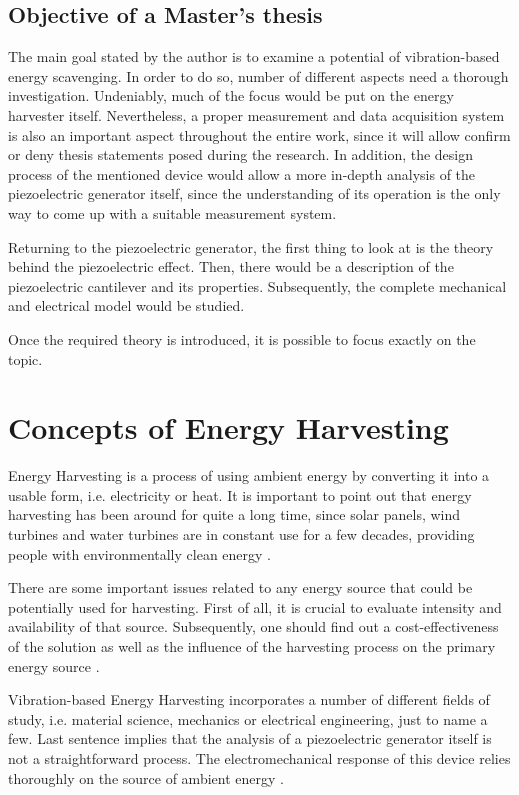 \documentclass[12pt,a4paper]{article}
\begin{document}
\subsection{Objective of a Master's thesis}
The main goal stated by the author is to examine a potential of vibration-based energy scavenging. In order to do so, number of different aspects need a thorough investigation. Undeniably, much of the focus would be put on the energy harvester itself. Nevertheless, a proper measurement and data acquisition system is also an important aspect throughout the entire work, since it will allow confirm or deny thesis statements posed during the research. In addition, the design process of the mentioned device would allow a more in-depth analysis of the piezoelectric generator itself, since the understanding of its operation is the only way to come up with a suitable measurement system.
\par
Returning to the piezoelectric generator, the first thing to look at is the theory behind the piezoelectric effect. Then, there would be a description of the piezoelectric cantilever  and its properties. Subsequently, the complete mechanical and electrical model would be studied.
\par

Once the required theory is introduced, it is possible to focus exactly on the topic.


\FloatBarrier

\section{Concepts of Energy Harvesting}
Energy Harvesting is a process of using ambient energy by converting it into a usable form, i.e. electricity or heat. It is important to point out that energy harvesting has been around for quite a long time, since solar panels, wind turbines and water turbines are in constant use for a few decades, providing people with environmentally clean energy \cite{EnHv1}.
\par

There are some important issues related to any energy source that could be potentially used for harvesting. First of all, it is crucial to evaluate intensity and availability of that source. Subsequently, one should find out a cost-effectiveness of the solution as well as the influence of the harvesting process on the primary energy source \cite{EnHv1}.
\par

Vibration-based Energy Harvesting incorporates a number of different fields of study, i.e. material science, mechanics or electrical engineering, just to name a few. Last sentence implies that the analysis of a piezoelectric generator itself is not a straightforward process. The electromechanical response of this device relies thoroughly on the source of ambient energy \cite{EnHv2}.
\par
\end{document}
